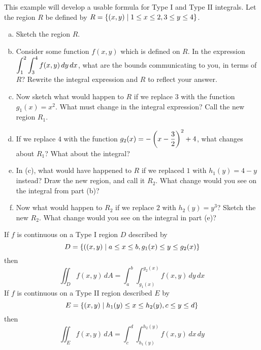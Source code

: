 \documentclass[notes]{subfiles}
\begin{document}
			\begin{ex}
				This example will develop a usable formula for Type I and Type II integrals. Let the region $R$ be defined by $R = \left\lbrace (x,y)\mid 1\leq x \leq 2, 3\leq y \leq 4 \right\rbrace$.
				\begin{enumerate}[(a)]
					\item Sketch the region $R$.
						
					\item Consider some function $f(x,y)$ which is defined on $R$. In the expression $\displaystyle \int_1^2\int_3^4 f(x,y)\, dy\, dx$, what are the bounds communicating to you, in terms of $R$? Rewrite the integral expression and $R$ to reflect your answer.
						
					\item Now sketch what would happen to $R$ if we replace $3$ with the function $g_1(x) = x^2$. What must change in the integral expression? Call the new region $R_1$.
						\newpage
						
					\item If we replace $4$ with the function $g_2(x) = -\left( x-\dfrac{3}{2}\right)^2 + 4$, what changes about $R_1$? What about the integral?
						
					\item In (c), what would have happened to $R$ if we replaced $1$ with $h_1(y) = 4-y$ instead? Draw the new region, and call it $R_2$. What change would you see on the integral from part (b)?
						
					\item Now what would happen to $R_2$ if we replace $2$ with $h_2(y) = y^3$? Sketch the new $R_2$. What change would you see on the integral in part (e)?
											
				\end{enumerate}
			\end{ex}
				\newpage
				
			\begin{rmk}
				If $f$ is continuous on a Type I region $D$ described by
				\[D = \left\lbrace ((x,y) \mid a\leq x\leq b, g_1(x)\leq y \leq g_2(x) \right\rbrace\]
				then
				\[\iint_D f(x,y)\, dA = \int_a^b \int_{g_1(x)}^{g_2(x)} f(x,y)\, dy\, dx\]
				$ $\\[10pt]
				
				If $f$ is continuous on a Type II region described $E$ by
				\[E = \left\lbrace (x,y)\mid h_1(y)\leq x\leq h_2(y), c\leq y\leq d \right\rbrace\]
				then
				\[\iint_E f(x,y)\, dA = \int_c^d \int_{h_1(y)}^{h_2(y)} f(x,y)\, dx\, dy\]
			\end{rmk}
			
\end{document}
